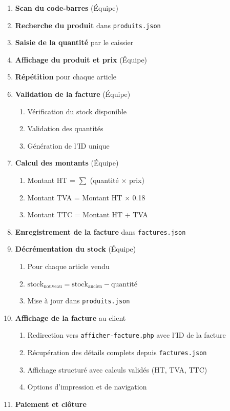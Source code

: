 \documentclass[12pt,a4paper]{report}
\begin{document}
\begin{enumerate}
    \item \textbf{Scan du code-barres} (Équipe)
    \item \textbf{Recherche du produit} dans \texttt{produits.json}
    \item \textbf{Saisie de la quantité} par le caissier
    \item \textbf{Affichage du produit et prix} (Équipe)
    \item \textbf{Répétition} pour chaque article
    \item \textbf{Validation de la facture} (Équipe)
    \begin{enumerate}
        \item Vérification du stock disponible
        \item Validation des quantités
        \item Génération de l'ID unique
    \end{enumerate}
    \item \textbf{Calcul des montants} (Équipe)
    \begin{enumerate}
        \item Montant HT = $\sum$ (quantité $\times$ prix)
        \item Montant TVA = Montant HT $\times$ 0.18
        \item Montant TTC = Montant HT + TVA
    \end{enumerate}
    \item \textbf{Enregistrement de la facture} dans \texttt{factures.json}
    \item \textbf{Décrémentation du stock} (Équipe)
    \begin{enumerate}
        \item Pour chaque article vendu
        \item $\text{stock}_{\text{nouveau}} = \text{stock}_{\text{ancien}} - \text{quantité}$
        \item Mise à jour dans \texttt{produits.json}
    \end{enumerate}
    \item \textbf{Affichage de la facture} au client
    \begin{enumerate}
        \item Redirection vers \texttt{afficher-facture.php} avec l'ID de la facture
        \item Récupération des détails complets depuis \texttt{factures.json}
        \item Affichage structuré avec calculs validés (HT, TVA, TTC)
        \item Options d'impression et de navigation
    \end{enumerate}
    \item \textbf{Paiement et clôture}
\end{enumerate}
\end{document}
